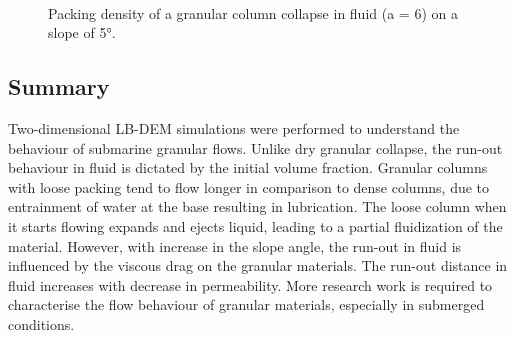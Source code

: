 \begin{figure}
\\
\caption{Packing density of a granular column collapse in fluid (a = 6) on a 
slope of 5\si{\degree}.}
\label{fig:a6_slope_voro}
\end{figure}

\subsection{Summary}

Two-dimensional LB-DEM simulations were performed to understand the behaviour 
of submarine granular flows. Unlike dry granular collapse, the run-out 
behaviour in fluid is dictated by the initial volume fraction. Granular columns 
with loose packing tend to flow longer in comparison to dense columns, due to 
entrainment of water at the base resulting in lubrication. The loose column 
when it starts flowing expands and ejects liquid, leading to a partial 
fluidization of the material. However, with increase in the slope angle, the 
run-out in fluid is influenced by the viscous drag on the granular materials. 
The run-out distance in fluid increases with decrease in permeability. More 
research work is required to characterise the flow behaviour of granular 
materials, especially in submerged conditions.
